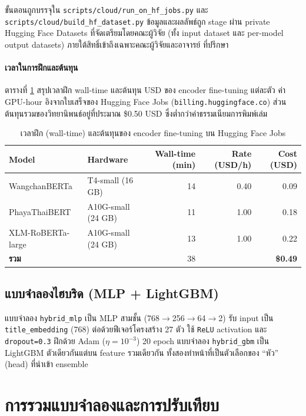 ขั้นตอนถูกบรรจุใน \texttt{scripts/cloud/run\_on\_hf\_jobs.py} และ
\texttt{scripts/cloud/build\_hf\_dataset.py} ข้อมูลและผลลัพธ์ถูก stage ผ่าน
private Hugging Face Datasets ที่จัดเตรียมโดยคณะผู้วิจัย (ทั้ง input dataset
และ per-model output datasets) ภายใต้สิทธิ์เข้าถึงเฉพาะคณะผู้วิจัยและอาจารย์
ที่ปรึกษา

\paragraph{เวลาในการฝึกและต้นทุน}
ตารางที่ \ref{tab:walltime} สรุปเวลาฝึก wall-time และต้นทุน USD ของ encoder
fine-tuning แต่ละตัว ค่า GPU-hour อิงจากใบเสร็จของ Hugging Face Jobs
(\texttt{billing.huggingface.co}) ส่วนต้นทุนรวมของวิทยานิพนธ์อยู่ที่ประมาณ
\$0.50 USD ซึ่งต่ำกว่าค่าธรรมเนียมการพิมพ์เล่ม

\begin{table}[H]
\centering
\caption{เวลาฝึก (wall-time) และต้นทุนของ encoder fine-tuning บน Hugging Face Jobs}
\label{tab:walltime}
\begin{tabularx}{\textwidth}{lXrrr}
\toprule
\textbf{Model} & \textbf{Hardware} & \textbf{Wall-time (min)} & \textbf{Rate (USD/h)} & \textbf{Cost (USD)} \\
\midrule
WangchanBERTa     & T4-small (16 GB)   & 14 & 0.40 & 0.09 \\
PhayaThaiBERT     & A10G-small (24 GB) & 11 & 1.00 & 0.18 \\
XLM-RoBERTa-large & A10G-small (24 GB) & 13 & 1.00 & 0.22 \\
\midrule
\textbf{รวม}      &                    & 38 &      & \textbf{\$0.49} \\
\bottomrule
\end{tabularx}
\end{table}

\subsection{แบบจำลองไฮบริด (MLP + LightGBM)}

แบบจำลอง \texttt{hybrid\_mlp} เป็น MLP สามชั้น (768$\to$256$\to$64$\to$2)
รับ input เป็น \texttt{title\_embedding} (768) ต่อด้วยฟีเจอร์โครงสร้าง 27 ตัว
ใช้ \texttt{ReLU} activation และ \texttt{dropout=0.3} ฝึกด้วย Adam ($\eta = 10^{-3}$)
20 epoch แบบจำลอง \texttt{hybrid\_gbm} เป็น LightGBM ตัวเดียวกันแต่บน feature
รวมเดียวกัน ทั้งสองทำหน้าที่เป็นตัวเลือกของ ``หัว'' (head) ที่นำเข้า ensemble

\section{การรวมแบบจำลองและการปรับเทียบ}
\label{sec:method-stacking}

